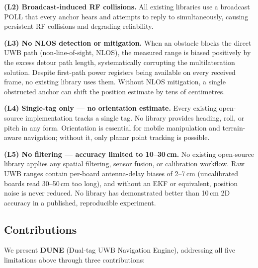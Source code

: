 \textbf{(L2) Broadcast-induced RF collisions.}
All existing libraries use a broadcast POLL that every anchor hears
and attempts to reply to simultaneously, causing persistent RF collisions
and degrading reliability.

\textbf{(L3) No NLOS detection or mitigation.}
When an obstacle blocks the direct UWB path (non-line-of-sight, NLOS),
the measured range is biased positively by the excess detour path length,
systematically corrupting the multilateration solution.
Despite first-path power registers being available on every received frame,
no existing library uses them.
Without NLOS mitigation, a single obstructed anchor can shift the position
estimate by tens of centimetres.

\textbf{(L4) Single-tag only --- no orientation estimate.}
Every existing open-source implementation tracks a single tag.
No library provides heading, roll, or pitch in any form.
Orientation is essential for mobile manipulation and terrain-aware navigation;
without it, only planar point tracking is possible.

\textbf{(L5) No filtering --- accuracy limited to 10--30\,cm.}
No existing open-source library applies any spatial filtering, sensor fusion,
or calibration workflow.
Raw UWB ranges contain per-board antenna-delay biases of 2--7\,cm
(uncalibrated boards read 30--50\,cm too long), and without an EKF or
equivalent, position noise is never reduced.
No library has demonstrated better than 10\,cm 2D accuracy in a published,
reproducible experiment.

\subsection{Contributions}
\label{sec:contributions}

We present \textbf{DUNE} (Dual-tag UWB Navigation Engine), addressing all five
limitations above through three contributions:

